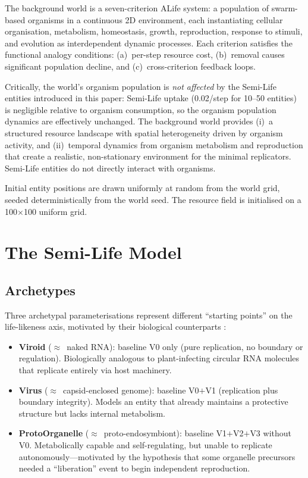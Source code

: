 \documentclass[letterpaper]{article}
\begin{document}
The background world is a seven-criterion ALife system: a population of
swarm-based organisms in a continuous 2D environment, each instantiating
cellular organisation, metabolism, homeostasis, growth, reproduction,
response to stimuli, and evolution as interdependent dynamic processes.
Each criterion satisfies the functional analogy conditions:
(a)~per-step resource cost, (b)~removal causes significant population
decline, and (c)~cross-criterion feedback loops.

Critically, the world's organism population is \emph{not affected} by the
Semi-Life entities introduced in this paper: Semi-Life uptake
(0.02/step for 10--50 entities) is negligible relative to organism
consumption, so the organism population dynamics are effectively
unchanged.
The background world provides (i)~a structured resource landscape with
spatial heterogeneity driven by organism activity, and (ii)~temporal
dynamics from organism metabolism and reproduction that create a
realistic, non-stationary environment for the minimal replicators.
Semi-Life entities do not directly interact with organisms.

Initial entity positions are drawn uniformly at random from the world
grid, seeded deterministically from the world seed.
The resource field is initialised on a 100$\times$100 uniform grid.

\section{The Semi-Life Model}
\label{sec:model}

\subsection{Archetypes}

Three archetypal parameterisations represent different ``starting points'' on
the life-likeness axis, motivated by their biological counterparts
\citep{urry_2020_campbell}:

\begin{itemize}
\item \textbf{Viroid} ($\approx$~naked RNA): baseline V0 only (pure
  replication, no boundary or regulation).
  Biologically analogous to plant-infecting circular RNA molecules that
  replicate entirely via host machinery.
\item \textbf{Virus} ($\approx$~capsid-enclosed genome): baseline V0$+$V1
  (replication plus boundary integrity).
  Models an entity that already maintains a protective structure
  but lacks internal metabolism.
\item \textbf{ProtoOrganelle} ($\approx$~proto-endosymbiont): baseline
  V1$+$V2$+$V3 without V0.
  Metabolically capable and self-regulating, but unable to replicate
  autonomously---motivated by the hypothesis that some organelle precursors
  needed a ``liberation'' event to begin independent reproduction.
\end{itemize}
\end{document}
